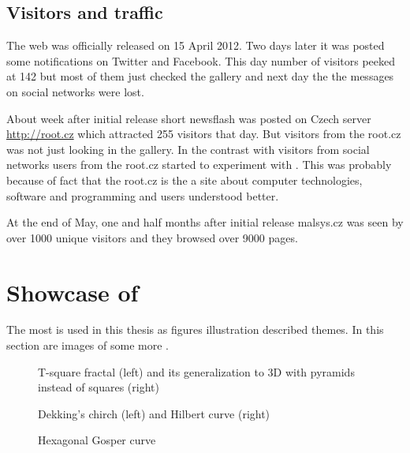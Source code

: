 \subsection{Visitors and traffic}

The web was officially released on 15 April 2012.
Two days later it was posted some notifications on Twitter and Facebook.
This day number of visitors peeked at 142 but most of them just checked the gallery and next day the the messages on social networks were lost.

About week after initial release short newsflash was posted on Czech server \url{http://root.cz} which attracted 255 visitors that day.
But visitors from the root.cz was not just looking in the gallery.
In the contrast with visitors from social networks users from the root.cz started to experiment with \lsystems.
This was probably because of fact that the root.cz is the a site about computer technologies, software and programming and users understood \lsystems better.

At the end of May, one and half months after initial release malsys.cz was seen by over 1000 unique visitors and they browsed over 9000 pages.


\section{Showcase of \lsystems}

The most \lsystems is used in this thesis as figures illustration described themes.
In this section are images of some more \lsystems.

\begin{figure}[h]
	 \hfill
	\caption{T-square fractal (left) and its generalization to 3D with pyramids instead of squares (right)}
\end{figure}

\begin{figure}[h]
	\hfill
	\caption{Dekking's chirch (left) and Hilbert curve (right)}
\end{figure}

\begin{figure}[p]
	\centering
	\caption{Hexagonal Gosper curve}
\end{figure}

